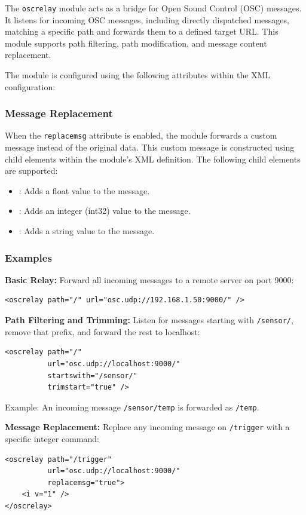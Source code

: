 The \texttt{oscrelay} module acts as a bridge for Open Sound Control
(OSC) messages. It listens for incoming OSC messages, including
directly dispatched messages, matching a specific path and forwards
them to a defined target URL. This module supports path filtering,
path modification, and message content replacement.

The module is configured using the following attributes within the XML configuration:



\subsubsection*{Message Replacement}

When the \texttt{replacemsg} attribute is enabled, the module forwards a custom message instead of the original data. This custom message is constructed using child elements within the module's XML definition. The following child elements are supported:

\begin{itemize}
    \item {}: Adds a float value to the message.
    \item {}: Adds an integer (int32) value to the message.
    \item {}: Adds a string value to the message.
\end{itemize}

\subsubsection*{Examples}

{\bf Basic Relay:} Forward all incoming messages to a remote server on
port 9000:
\begin{lstlisting}[numbers=none]
<oscrelay path="/" url="osc.udp://192.168.1.50:9000/" />
\end{lstlisting}

{\bf Path Filtering and Trimming:} Listen for messages starting
with \texttt{/sensor/}, remove that prefix, and forward the rest to
localhost:
\begin{lstlisting}[numbers=none]
<oscrelay path="/" 
          url="osc.udp://localhost:9000/" 
          startswith="/sensor/" 
          trimstart="true" />
\end{lstlisting}
{Example:} An incoming message \texttt{/sensor/temp} is forwarded as \texttt{/temp}.


{\bf Message Replacement:} Replace any incoming message
on \texttt{/trigger} with a specific integer command:
\begin{lstlisting}[numbers=none]
<oscrelay path="/trigger" 
          url="osc.udp://localhost:9000/" 
          replacemsg="true">
    <i v="1" />
</oscrelay>
\end{lstlisting}

